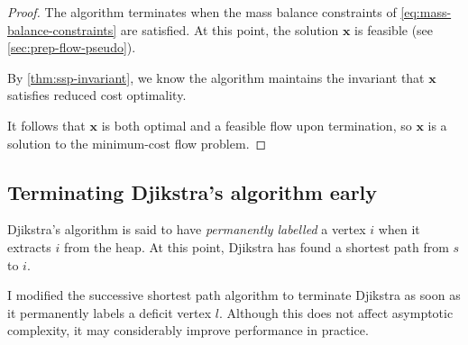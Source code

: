 \sspcorrectness*
\begin{proof}
    The algorithm terminates when the mass balance constraints of \cref{eq:mass-balance-constraints} are satisfied. At this point, the solution $\mathbf{x}$ is feasible (see \cref{sec:prep-flow-pseudo}). 
    
    By \cref{thm:ssp-invariant}, we know the algorithm maintains the invariant that $\mathbf{x}$ satisfies reduced cost optimality. 
    
    It follows that $\mathbf{x}$ is both optimal and a feasible flow upon termination, so $\mathbf{x}$ is a solution to the minimum-cost flow problem.
\end{proof}

\subsection{Terminating Djikstra's algorithm early} \label{appendix:impl-ssp:partial-djikstra}

Djikstra's algorithm is said to have \emph{permanently labelled} a vertex $i$ when it extracts $i$ from the heap. At this point, Djikstra has found a shortest path from $s$ to $i$.

I modified the successive shortest path algorithm to terminate Djikstra as soon as it permanently labels a deficit vertex $l$. Although this does not affect asymptotic complexity, it may considerably improve performance in practice.\\

